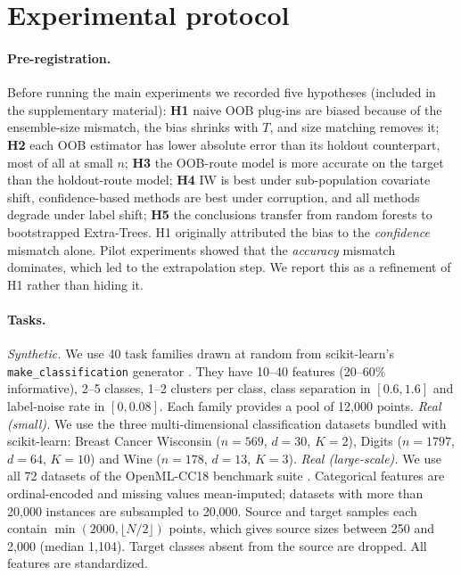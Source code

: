 \section{Experimental protocol}
\label{sec:protocol}

\paragraph{Pre-registration.}
Before running the main experiments we recorded five hypotheses (included in the supplementary material):
\textbf{H1} naive OOB plug-ins are biased because of the ensemble-size mismatch, the bias shrinks with $T$, and size matching removes it;
\textbf{H2} each OOB estimator has lower absolute error than its holdout counterpart, most of all at small $n$;
\textbf{H3} the OOB-route model is more accurate on the target than the holdout-route model;
\textbf{H4} IW is best under sub-population covariate shift, confidence-based methods are best under corruption, and all methods degrade under label shift;
\textbf{H5} the conclusions transfer from random forests to bootstrapped Extra-Trees.
H1 originally attributed the bias to the \emph{confidence} mismatch alone. Pilot experiments showed that the \emph{accuracy} mismatch dominates, which led to the extrapolation step. We report this as a refinement of H1 rather than hiding it.

\paragraph{Tasks.}
\emph{Synthetic.} We use 40 task families drawn at random from scikit-learn's \texttt{make\_classification} generator \citep{pedregosa2011sklearn}. They have 10--40 features (20--60\% informative), 2--5 classes, 1--2 clusters per class, class separation in $[0.6,1.6]$ and label-noise rate in $[0,0.08]$. Each family provides a pool of 12{,}000 points.
\emph{Real (small).} We use the three multi-dimensional classification datasets bundled with scikit-learn: Breast Cancer Wisconsin ($n=569$, $d=30$, $K=2$), Digits ($n=1797$, $d=64$, $K=10$) and Wine ($n=178$, $d=13$, $K=3$).
\emph{Real (large-scale).} We use all 72 datasets of the OpenML-CC18 benchmark suite \citep{bischl2021openml}. Categorical features are ordinal-encoded and missing values mean-imputed; datasets with more than 20{,}000 instances are subsampled to 20{,}000. Source and target samples each contain $\min(2000,\lfloor N/2\rfloor)$ points, which gives source sizes between 250 and 2{,}000 (median 1{,}104). Target classes absent from the source are dropped.
All features are standardized.

